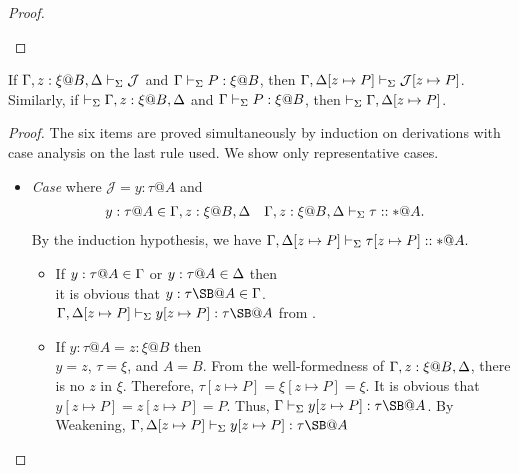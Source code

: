 \begin{proof}
\begin{itemize}
	\end{itemize}
\end{proof}

\begin{theorem}
	If $\G, z:\xi@B, \D \V \mathcal{J}$ and $\Gamma\vdash_\Sigma P:\xi @B$, then $\Gamma, \Delta[z \mapsto P] \vdash_\Sigma \mathcal{J}[z \mapsto P]$.  Similarly, if $\V \G, z:\xi@B, \D$ and
	$\Gamma\vdash_\Sigma P:\xi @B$, then $\vdash_\Sigma \Gamma, \Delta[z \mapsto P]$.
\end{theorem}
\begin{proof}
	The six items are proved simultaneously by induction on derivations with case analysis on the last rule used.
	We show only representative cases.
	\begin{itemize}
										
		\newcommand{\SB}{[z \mapsto P]}
		\newcommand{\GG}{\G}
		\newcommand{\GGV}{\G \V}
										
		\item[] \textit{Case} \TVar{} where \(\mathcal{J} = y:\tau@A\) and 
		      \begin{align*} 
		      	  & y:\tau@A \in \G, z:\xi@B, \D &   & \G, z:\xi@B,\D \V \tau::*@A. 
		      \end{align*}
		      By the induction hypothesis, we have \(\G, \D\SB \V \tau\SB::*@A.\)
		      		      		      		      
		      \begin{itemize}
		      	\item If $y:\tau@A \in \G$ or $y:\tau@A \in \D$ then\\
		      	      it is obvious that $y:\tau\SB@A \in \GG$.\\
		      	      \(\G,\D\SB \V y\SB:\tau\SB@A\) from \TVar.
		      	      		      	      	      	      		      	      	      		      	      
		      	\item If $y:\tau@A = z:\xi@B$ then\\
		      	      $y = z$, $\tau = \xi$, and $A = B$.
		      	      From the well-formedness of \( \G, z:\xi@B,\D \), there is no $z$ in $\xi$.
		      	      Therefore, $\tau\SB = \xi\SB = \xi$.
		      	      It is obvious that $y\SB = z\SB = P$.
		      	      Thus, $\G \V y\SB : \tau\SB@A$.
		      	      By Weakening, $\G,\D\SB \V y\SB : \tau\SB@A$
		      	      		      	      
		      \end{itemize}
		      \vspace{3mm}
		      

\end{itemize}
\end{proof}
